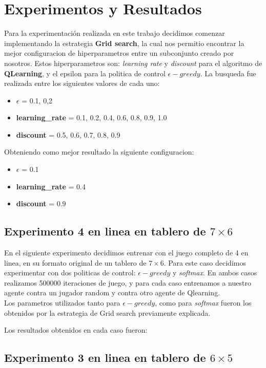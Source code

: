 \section{Experimentos y Resultados}
Para la experimentación realizada en este trabajo decidimos comenzar implementando la estrategia \textbf{Grid search},
la cual nos permitio encontrar la mejor configuracion de hiperparametros entre un subconjunto creado por nosotros. Estos
hiperparametros son: \textit{learning rate} y \textit{discount} para el algoritmo de \textbf{QLearning}, y el epsilon para
la politica de control \textbf{$\epsilon-greedy$}. La busqueda fue realizada entre los siguientes valores de cada uno:

\begin{itemize}
  \item  \textbf{$\epsilon$} = 0.1, 0,2
  \item \textbf{learning\_rate} = 0.1, 0.2, 0.4, 0.6, 0.8, 0.9, 1.0
  \item \textbf{discount} = 0.5, 0.6, 0.7, 0.8, 0.9
\end{itemize}


Obteniendo como mejor resultado la siguiente configuracion:

\begin{itemize}
  \item  \textbf{$\epsilon$} = 0.1
  \item \textbf{learning\_rate} = 0.4
  \item \textbf{discount} = 0.9
\end{itemize}


\subsection{Experimento 4 en linea en tablero de $7\times6$}
En el siguiente experimento decidimos entrenar con el juego completo de 4 en linea, en su formato original de un tablero
de $7\times6$. Para este caso decidimos experimentar con dos politicas de control: \textit{$\epsilon-greedy$} y
\textit{softmax}. En ambos casos realizamos 500000 iteraciones de juego, y para cada caso entrenamos a nuestro agente
contra un jugador random y contra otro agente de Qlearning. \\
Los parametros utilizados tanto para \textit{$\epsilon-greedy$}, como para \textit{softmax} fueron los obtenidos por la
estrategia de Grid search previamente explicada.

Los resultados obtenidos en cada caso fueron:





\subsection{Experimento 3 en linea en tablero de $6\times5$}
